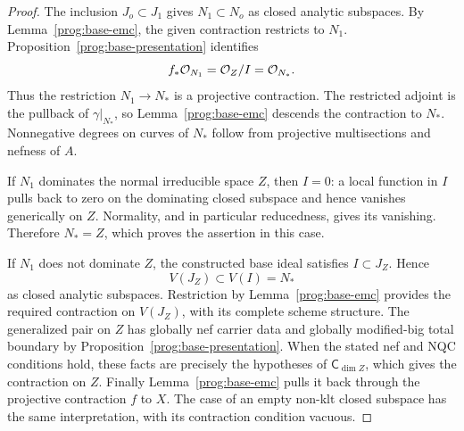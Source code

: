 \begin{proof}
The inclusion $J_o\subset J_1$ gives $N_1\subset N_o$
as closed analytic subspaces. By
Lemma~\ref{prog:base-emc}, the given contraction restricts to
$N_1$. Proposition~\ref{prog:base-presentation} identifies
\[
              f_*\mathcal O_{N_1}=\mathcal O_Z/I=\mathcal O_{N_*}.
\]
Thus the restriction $N_1\to N_*$ is a projective
contraction. The restricted adjoint is the pullback of
$\gamma|_{N_*}$, so Lemma~\ref{prog:base-emc} descends
the contraction to $N_*$. Nonnegative degrees on curves of
$N_*$ follow from projective multisections and nefness of
$A$.

If $N_1$ dominates the normal irreducible space $Z$, then
$I=0$: a local function in $I$ pulls back to zero on the
dominating closed subspace and hence vanishes generically on
$Z$. Normality, and in particular reducedness, gives its
vanishing. Therefore $N_*=Z$, which proves the assertion in
this case.

If $N_1$ does not dominate $Z$, the constructed base ideal
satisfies $I\subset J_Z$. Hence
\[
                 V(J_Z)\subset V(I)=N_*
\]
as closed analytic subspaces. Restriction by
Lemma~\ref{prog:base-emc} provides the required contraction
on $V(J_Z)$, with its complete scheme structure. The
generalized pair on $Z$ has globally nef carrier data and
globally modified-big total boundary by
Proposition~\ref{prog:base-presentation}. When the stated
nef and NQC conditions hold, these facts are precisely the
hypotheses of $\mathsf C_{\dim Z}$, which gives the
contraction on $Z$. Finally Lemma~\ref{prog:base-emc}
pulls it back through the projective contraction $f$ to $X$.
The case of an empty non-klt closed subspace has the same
interpretation, with its contraction condition vacuous.
\end{proof}
